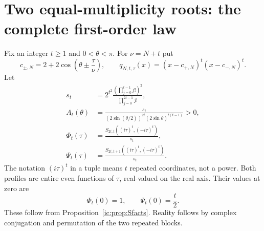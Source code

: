 \documentclass[11pt,a4paper]{article}
\numberwithin{equation}{section}
\theoremstyle{definition}
\theoremstyle{remark}
\begin{document}
\section{Two equal-multiplicity roots: the complete first-order law}
\label{ic:sec:pair}
Fix an integer $t\ge1$ and $0<\theta<\pi$. For $\nu=N+t$ put
\begin{equation}\label{ic:eq:pairroots}
 c_{\pm,N}=2+2\cos\left(\theta\pm\frac\tau\nu\right),
 \qquad q_{N,t,\tau}(x)=(x-c_{+,N})^t(x-c_{-,N})^t.
\end{equation}
Let
\begin{align}
 s_t&=2^{t^2}\frac{\left(\prod_{j=0}^{t-1}j!\right)^2}
                         {\prod_{j=0}^{2t-1}j!},\label{ic:eq:st}\\
 A_t(\theta)&=\frac{s_t}{(2\sin(\theta/2))^{2t}
                              (2\sin\theta)^{t(t-1)}}>0,\label{ic:eq:At}\\
 \Phi_t(\tau)&=\frac{S_{2t,t}((i\tau)^t,(-i\tau)^t)}{s_t},\label{ic:eq:Phi}\\
 \Psi_t(\tau)&=\frac{S_{2t,t+1}((i\tau)^t,(-i\tau)^t)}{s_t}.
 \label{ic:eq:Psi}
\end{align}
The notation $(i\tau)^t$ in a tuple means $t$ repeated coordinates, not
a power. Both profiles are entire even functions of $\tau$, real-valued
on the real axis. Their values at zero are
\begin{equation}\label{ic:eq:Phizero}
 \Phi_t(0)=1,\qquad \Psi_t(0)=\frac t2.
\end{equation}
These follow from Proposition~\ref{ic:prop:Sfacts}. Reality follows by
complex conjugation and permutation of the two repeated blocks.
\end{document}
